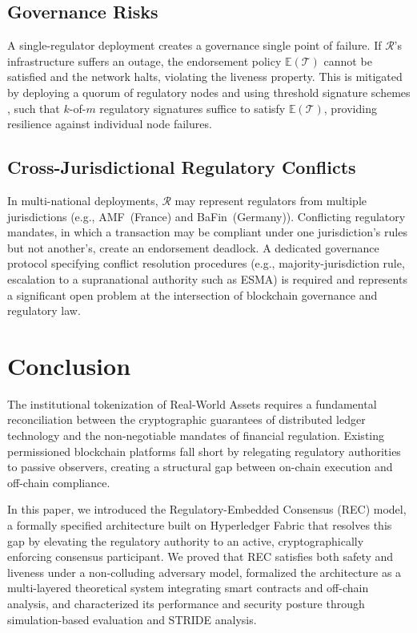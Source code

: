 \documentclass[journal,10pt,twocolumn]{IEEEtran}
\begin{document}
\subsection{Governance Risks}

A single-regulator deployment creates a governance single point of failure. If $\mathcal{R}$'s infrastructure suffers an outage, the endorsement policy $\mathbb{E}(\mathcal{T})$ cannot be satisfied and the network halts, violating the liveness property. This is mitigated by deploying a quorum of regulatory nodes and using threshold signature schemes \cite{ref:threshold_sig}, such that $k$-of-$m$ regulatory signatures suffice to satisfy $\mathbb{E}(\mathcal{T})$, providing resilience against individual node failures.

\subsection{Cross-Jurisdictional Regulatory Conflicts}

In multi-national deployments, $\mathcal{R}$ may represent regulators from multiple jurisdictions (e.g., AMF~(France) and BaFin~(Germany)). Conflicting regulatory mandates, in which a transaction may be compliant under one jurisdiction's rules but not another's, create an endorsement deadlock. A dedicated governance protocol specifying conflict resolution procedures (e.g., majority-jurisdiction rule, escalation to a supranational authority such as ESMA) is required and represents a significant open problem at the intersection of blockchain governance and regulatory law.

\section{Conclusion}
\label{sec:conclusion}

The institutional tokenization of Real-World Assets requires a fundamental reconciliation between the cryptographic guarantees of distributed ledger technology and the non-negotiable mandates of financial regulation. Existing permissioned blockchain platforms fall short by relegating regulatory authorities to passive observers, creating a structural gap between on-chain execution and off-chain compliance.

In this paper, we introduced the Regulatory-Embedded Consensus (REC) model, a formally specified architecture built on Hyperledger Fabric that resolves this gap by elevating the regulatory authority to an active, cryptographically enforcing consensus participant. We proved that REC satisfies both safety and liveness under a non-colluding adversary model, formalized the architecture as a multi-layered theoretical system integrating smart contracts and off-chain analysis, and characterized its performance and security posture through simulation-based evaluation and STRIDE analysis.
\end{document}
